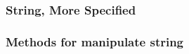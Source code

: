 \documentclass[
  11pt, %
  xcolor=dvipsnames
]{beamer}
\begin{document}
\begin{frame}[fragile]
\begin{columns}[c]
\begin{column}{0.9\textwidth}
\begin{table}
\begin{tabular}{l l l}
					\bottomrule
				\end{tabular}
			\end{table}


		\end{column}
	\end{columns}

\end{frame}



\subsubsection{String, More Specified}
\begin{frame}[fragile]
	\frametitle{Methods for manipulate string}



\end{frame}
\end{document}
